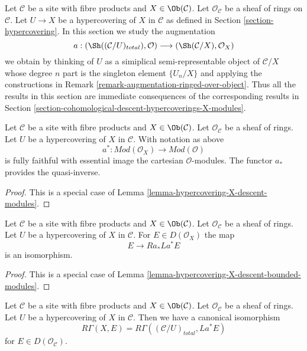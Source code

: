 \noindent
Let $\mathcal{C}$ be a site with fibre products and $X \in \Ob(\mathcal{C})$.
Let $\mathcal{O}_\mathcal{C}$ be a sheaf of rings on $\mathcal{C}$.
Let $U \to X$ be a hypercovering of $X$ in $\mathcal{C}$ as defined
in Section \ref{section-hypercovering}. In this section we study the
augmentation
$$
a :
(\Sh((\mathcal{C}/U)_{total}), \mathcal{O})
\longrightarrow
(\Sh(\mathcal{C}/X), \mathcal{O}_X)
$$
we obtain by thinking of $U$ as a simiplical semi-representable
object of $\mathcal{C}/X$ whose degree $n$ part is the singleton
element $\{U_n/X\}$ and applying the constructions in
Remark \ref{remark-augmentation-ringed-over-object}.
Thus all the results in this section are immediate consequences
of the corresponding results in
Section \ref{section-cohomological-descent-hypercoverings-X-modules}.

\begin{lemma}
\label{lemma-hypercovering-X-simple-descent-modules}
Let $\mathcal{C}$ be a site with fibre products and $X \in \Ob(\mathcal{C})$.
Let $\mathcal{O}_\mathcal{C}$ be a sheaf of rings.
Let $U$ be a hypercovering of $X$ in $\mathcal{C}$. With notation as above
$$
a^* : \textit{Mod}(\mathcal{O}_X) \to \textit{Mod}(\mathcal{O})
$$
is fully faithful with essential image the cartesian $\mathcal{O}$-modules.
The functor $a_*$ provides the quasi-inverse.
\end{lemma}

\begin{proof}
This is a special case of
Lemma \ref{lemma-hypercovering-X-descent-modules}.
\end{proof}

\begin{lemma}
\label{lemma-hypercovering-X-simple-descent-bounded-modules}
Let $\mathcal{C}$ be a site with fibre products and $X \in \Ob(\mathcal{C})$.
Let $\mathcal{O}_\mathcal{C}$ be a sheaf of rings.
Let $U$ be a hypercovering of $X$ in $\mathcal{C}$. For
$E \in D(\mathcal{O}_X)$ the map
$$
E \longrightarrow Ra_*La^*E
$$
is an isomorphism.
\end{lemma}

\begin{proof}
This is a special case of
Lemma \ref{lemma-hypercovering-X-descent-bounded-modules}.
\end{proof}

\begin{lemma}
\label{lemma-compare-cohomology-hypercovering-X-simple-modules}
Let $\mathcal{C}$ be a site with fibre products and $X \in \Ob(\mathcal{C})$.
Let $\mathcal{O}_\mathcal{C}$ be a sheaf of rings.
Let $U$ be a hypercovering of $X$ in $\mathcal{C}$.
Then we have a canonical isomorphism
$$
R\Gamma(X, E) = R\Gamma((\mathcal{C}/U)_{total}, La^*E)
$$
for $E \in D(\mathcal{O}_\mathcal{C})$.
\end{lemma}

